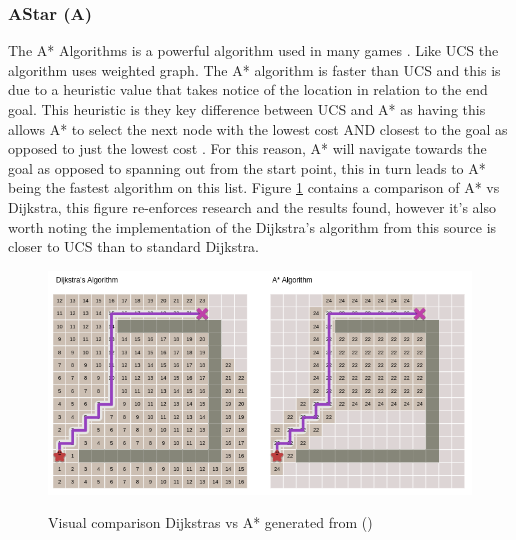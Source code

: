 \subsubsection{AStar (A\*)}
The A* Algorithms is a powerful algorithm used in many games \cite{cai_2015_a}. Like UCS the algorithm uses weighted graph. The A* algorithm is faster than UCS and this is due to a heuristic value that takes notice of the location in relation to the end goal. This heuristic is they key difference between UCS and A* as having this allows A* to select the next node with the lowest cost AND closest to the goal as opposed to just the lowest cost \cite{cai_2015_a}. For this reason, A* will navigate towards the goal as opposed to spanning out from the start point, this in turn leads to A* being the fastest algorithm on this list. Figure \ref{fig:dijkvsastar} contains a comparison of A* vs Dijkstra, this figure re-enforces research and the results found, however it's also worth noting the implementation of the Dijkstra's algorithm from this source is closer to UCS than to standard Dijkstra. 
\begin{figure}[h]
	\includegraphics[width=\linewidth]{images/research/Dijkstrasvastar.png}\\
	\caption{Visual comparison Dijkstras vs A* generated from (\cite{redblobgames_2014_red})}
	\label{fig:dijkvsastar}
\end{figure}
